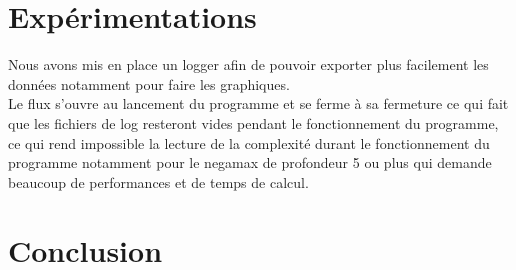 \documentclass[12pt]{article}
\begin{document}
\section{Expérimentations}

Nous avons mis en place un logger afin de pouvoir exporter plus facilement les données notamment pour faire les graphiques.\\

Le flux s'ouvre au lancement du programme et se ferme à sa fermeture ce qui fait que les fichiers de log resteront vides pendant le fonctionnement du programme, ce qui rend impossible la lecture de la complexité durant le fonctionnement du programme notamment pour le negamax de profondeur 5 ou plus qui demande beaucoup de performances et de temps de calcul.


\section{Conclusion}
\end{document}
